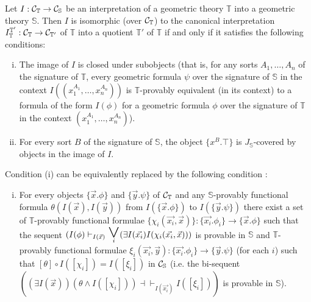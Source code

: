 \documentclass[a4paper,12pt]{article}
\begin{document}
\begin{corollary}\label{corinterpretationinclusion}
	Let $I:{\cal C}_{\mathbb T}\to {\cal C}_{\mathbb S}$ be an interpretation of a geometric theory $\mathbb T$ into a geometric theory ${\mathbb S}$. Then $I$ is isomorphic (over ${\cal C}_{\mathbb T}$) to the canonical interpretation $I_{\mathbb T}^{{\mathbb T}'}:{\cal C}_{\mathbb T}\to {\cal C}_{{\mathbb T}'}$ of ${\mathbb T}$ into a quotient ${\mathbb T}'$ of ${\mathbb T}$ if and only if it satisfies the following conditions:
		\begin{enumerate}[(i)]		
		\item The image of $I$ is closed under subobjects (that is, for any sorts $A_{1}, \ldots, A_{n}$ of the signature of $\mathbb T$, every geometric formula $\psi$ over the signature of $\mathbb S$ in the context $I((x_{1}^{A_{1}}, \ldots, x_{n}^{A_{n}}))$ is $\mathbb T$-provably equivalent (in its context) to a formula of the form $I(\phi)$ for a geometric formula $\phi$ over the signature of $\mathbb T$ in the context $(x_{1}^{A_{1}}, \ldots, x_{n}^{A_{n}})$). 	 
		
		\item For every sort $B$ of the signature of $\mathbb S$, the object $\{x^{B}. \top\}$ is $J_{\mathbb S}$-covered by objects in the image of $I$.  
	\end{enumerate}
	Condition (i) can be equivalently replaced by the following condition : 
	\begin{enumerate}[(i)]		
		\item[(i)'] For every objects $\{\vec{x}. \phi\}$ and $\{\vec{y}. \psi\}$ of ${\cal C}_{\mathbb T}$ and any $\mathbb S$-provably functional formula $\theta(I(\vec{x}), I(\vec{y}))$ from $I(\{\vec{x}. \phi\})$ to $I(\{\vec{y}. \psi\})$ there exist a set of $\mathbb T$-provably functional formulae $\{\chi_{i}(\vec{x_i}, \vec{x}) \}:\{\vec{x_i}. \phi_{i}\}\to \{\vec{x}. \phi\}$ such that the sequent
		$(I(\phi) \vdash_{I(\vec{x})} \mathbin{\mathop{\textup{\huge $\vee$}}\limits_{i}}(\exists I(\vec{x_{i}}) I(\chi_{i}(\vec{x_i}, \vec{x})))$ is provable in $\mathbb S$ and $\mathbb T$-provably functional formulae $\xi_{i}(\vec{x_i}, \vec{y}):\{\vec{x_i}. \phi_{i}\} \to \{\vec{y}. \psi\}$ (for each $i$) such that $[\theta]\circ I([\chi_{i}])=I([\xi_{i}])$ in ${\cal C}_{\mathbb S}$ (i.e. the bi-sequent $((\exists I(\vec{x}))(\theta \wedge I([\chi_i])) \dashv \vdash_{I(\vec{x_{i}})} I([\xi_{i}]))$ is provable in $\mathbb S$). 
	\end{enumerate} 
\end{corollary}	  
\end{document}
